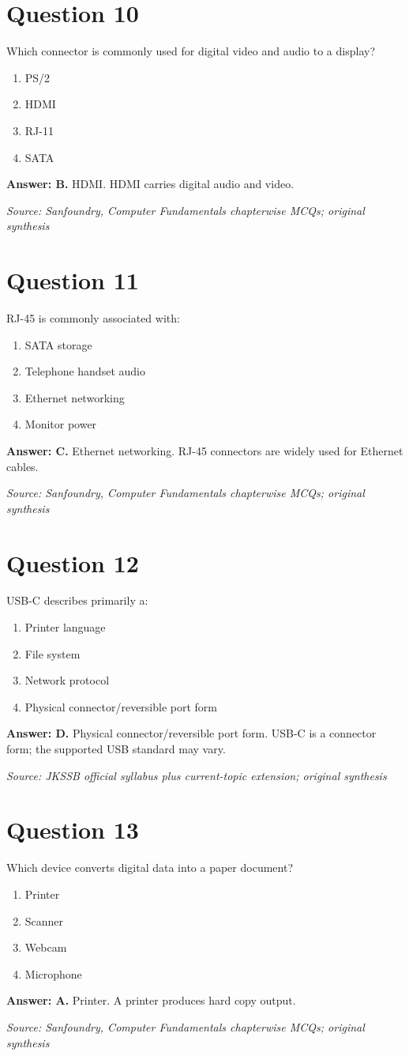 \documentclass[11pt,a4paper]{book}
\newcommand{\source}[1]{\par\smallskip\textit{Source: #1}}
\newcommand{\answer}[2]{\par\textbf{Answer: #1.} #2}
\begin{document}
\section*{Question 10}
Which connector is commonly used for digital video and audio to a display?
\begin{enumerate}[label=\Alph*.]
\item PS/2
\item HDMI
\item RJ-11
\item SATA
\end{enumerate}
\answer{B}{HDMI. HDMI carries digital audio and video.}
\source{Sanfoundry, Computer Fundamentals chapterwise MCQs; original synthesis}
\section*{Question 11}
RJ-45 is commonly associated with:
\begin{enumerate}[label=\Alph*.]
\item SATA storage
\item Telephone handset audio
\item Ethernet networking
\item Monitor power
\end{enumerate}
\answer{C}{Ethernet networking. RJ-45 connectors are widely used for Ethernet cables.}
\source{Sanfoundry, Computer Fundamentals chapterwise MCQs; original synthesis}
\section*{Question 12}
USB-C describes primarily a:
\begin{enumerate}[label=\Alph*.]
\item Printer language
\item File system
\item Network protocol
\item Physical connector/reversible port form
\end{enumerate}
\answer{D}{Physical connector/reversible port form. USB-C is a connector form; the supported USB standard may vary.}
\source{JKSSB official syllabus plus current-topic extension; original synthesis}
\section*{Question 13}
Which device converts digital data into a paper document?
\begin{enumerate}[label=\Alph*.]
\item Printer
\item Scanner
\item Webcam
\item Microphone
\end{enumerate}
\answer{A}{Printer. A printer produces hard copy output.}
\source{Sanfoundry, Computer Fundamentals chapterwise MCQs; original synthesis}
\end{document}

